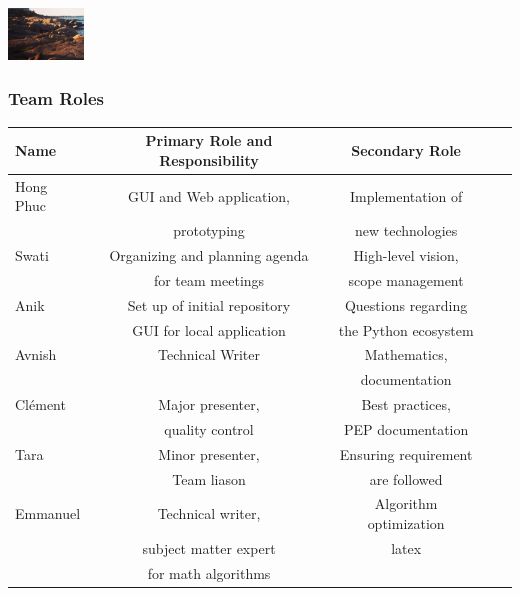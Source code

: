 \documentclass{beamer}
\begin{document}
\begin{frame}
\hfil\hfil\hfil\includegraphics[width=2cm]{Screen Shot}\newline
\null\hfil\hfil{}
\hfil\hfil\makebox[2cm]{\[x^y\]}
\hfil\hfil{}\newline
\end{frame}



  \begin{frame}
\frametitle{Team Roles}
\small
\begin{table}
\begin{tabular}{l | c | c | c | c }
Name & Primary Role and Responsibility & Secondary Role \\
\hline
Hong Phuc & GUI and Web application,& Implementation of\\
& prototyping & new technologies\\
\hline
Swati & Organizing and planning agenda& High-level vision, \\
& for team meetings & scope management\\
\hline
Anik & Set up of initial repository& Questions regarding\\
& GUI for local application & the Python ecosystem\\
\hline
Avnish & Technical Writer & Mathematics, \\
& & documentation\\
\hline
Clément & Major presenter, & Best practices, \\
& quality control  & PEP documentation\\
\hline
Tara & Minor presenter, & Ensuring requirement \\
& Team liason  & are followed\\
\hline
Emmanuel & Technical writer, &  Algorithm optimization\\
& subject matter expert  & latex\\
& for math algorithms  & \\
\end{tabular}
\end{table}
\end{frame}
\end{document}
